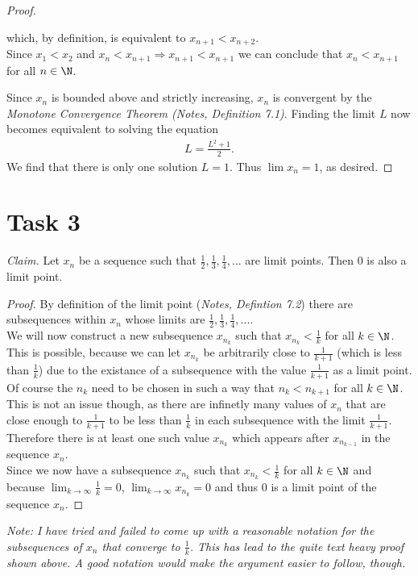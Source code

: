 \documentclass{article}
\begin{document}
\begin{proof}
\begin{adjustwidth}{2em}{0pt}
\begin{claimproof}
    which, by definition, is equivalent to $x_{n+1}<x_{n+2}$.\\
    Since $x_1<x_2$ and $x_n<x_{n+1}\Rightarrow x_{n+1}<x_{n+1}$ we can conclude that $x_n<x_{n+1}$ for all $n\in\N$.
  \end{claimproof}
\end{adjustwidth}
Since $x_n$ is bounded above and strictly increasing, $x_n$ is convergent by the \emph{Monotone Convergence Theorem (Notes, Definition 7.1)}. Finding the limit $L$ now becomes equivalent to solving the equation
\begin{align*}
  L=\frac{L^2+1}{2}.
\end{align*}
We find that there is only one solution $L=1$. Thus $\lim x_n=1$, as desired.
\end{proof}
\section*{Task 3}
\emph{Claim.} Let $x_n$ be a sequence such that $\frac{1}{2}, \frac{1}{3}, \frac{1}{4}, ...$ are limit points. Then $0$ is also a limit point.
\begin{proof}
  By definition of the limit point (\emph{Notes, Defintion 7.2}) there are subsequences within $x_n$ whose limits are $\frac{1}{2}, \frac{1}{3}, \frac{1}{4}, ...$. \\
  We will now construct a new subsequence $x_{n_k}$ such that $x_{n_k}<\frac{1}{k}$ for all $k\in\N$.\\
  This is possible, because we can let $x_{n_k}$ be arbitrarily close to $\frac{1}{k+1}$ (which is less than $\frac{1}{k}$) due to the existance of a subsequence with the value $\frac{1}{k+1}$ as a limit point. Of course the $n_k$ need to be chosen in such a way that $n_k<n_{k+1}$ for all $k\in\N$. This is not an issue though, as there are infinetly many values of $x_n$ that are close enough to $\frac{1}{k+1}$ to be less than $\frac{1}{k}$ in each subsequence with the limit $\frac{1}{k+1}$. Therefore there is at least one such value $x_{n_k}$ which appears after $x_{n_{k-1}}$ in the sequence $x_n$.\\
  Since we now have a subsequence $x_{n_k}$ such that $x_{n_k}<\frac{1}{k}$ for all $k\in\N$ and because $\lim_{k\to\infty} \frac{1}{k} = 0$, $\lim_{k\to\infty} x_{n_k}=0$ and thus $0$ is a limit point of the sequence $x_n$.
\end{proof}
\emph{Note: I have tried and failed to come up with a reasonable notation for the subsequences of $x_n$ that converge to $\frac{1}{k}$. This has lead to the quite text heavy proof shown above. A good notation would make the argument easier to follow, though.}
\end{document}

